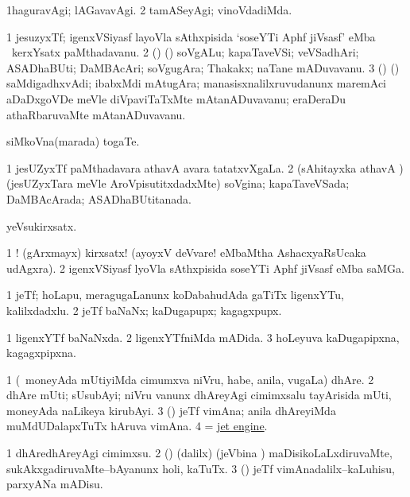 \bentry
{}
\gl{\kirxvi}
\bmng
\bnum
\num{1}haguravAgi; lAGavavAgi. 
\num{2} tamASeyAgi; vinoVdadiMda. 
\enum
\emng
\eentry

\bentry
{}
\gl{\nA}
\bmng
\bnum
\num{1} jesuzyxTf; igenxVSiyasf layoVla sAthxpisida `soseYTi Aphf jiVsasf' eMba \roVkAyx\ kerxYsatx paMthadavanu. 
\num{2} (\hiV) (\pArxparx) soVgALu; kapaTaveVSi; veVSadhAri; ASADhaBUti; DaMBAcAri; soVgugAra; Thakakx; naTane mADuvavanu. 
\num{3} (\ca) (\hiV) saMdigadhxvAdi; ibabxMdi mAtugAra; manasisxnalilxruvudanunx maremAci aDaDxgoVDe meVle diVpaviTaTxMte mAtanADuvavanu; eraDeraDu athaRbaruvaMte mAtanADuvavanu. 
\enum
\emng

\noindent
\gl{\pagu}
\bmng
{} siMkoVna(marada) togaTe. 
\emng
\eentry

\bentry
{}
\gl{\gu}
\bmng
\bnum
\num{1} jesUZyxTf paMthadavara athavA avara tatatxvXgaLa. 
\num{2} (sAhitayxka athavA \hiV) (jesUZyxTara meVle AroVpisutitxdadxMte) soVgina; kapaTaveVSada; DaMBAcArada; ASADhaBUtitanada. 
\enum
\emng
\eentry

\bentry
{}
\gl{\nA}
\bmng
yeVsukirxsatx. 
\emng

\noindent
\gl{\pagu}
\bmng
\bnum
\num{1} ! (gArxmayx) kirxsatx! (ayoyxV deVvare! eMbaMtha AshacxyaRsUcaka udAgxra). 
\num{2}  igenxVSiyasf lyoVla sAthxpisida soseYTi Aphf jiVsasf eMba saMGa. 
\enum
\emng
\eentry

\bentry
{}
\gl{\nA}
\bmng
\bnum
\num{1} jeTf; hoLapu, meragugaLanunx koDabahudAda gaTiTx ligenxYTu, kalilxdadxlu. 
\hypertarget{jet(1)2}{} 
\num{2} jeTf baNaNx; kaDugapupx; kagagxpupx. 
\enum
\emng
\eentry

\bentry
{}
\gl{\gu}
\bmng
\bnum
\num{1} ligenxYTf baNaNxda. 
\num{2} ligenxYTfniMda mADida. 
\hypertarget{jet(2)3}{} 
\num{3} hoLeyuva kaDugapipxna, kagagxpipxna. 
\enum
\emng
\eentry

\bentry
{}
\gl{\nA}
\bmng
\bnum
\num{1} (\kanmu\ moneyAda mUtiyiMda cimumxva niVru, habe, anila, \mo vugaLa) dhAre. 
\num{2} dhAre mUti; sUsubAyi; niVru \mo vanunx dhAreyAgi cimimxsalu tayArisida mUti, moneyAda naLikeya kirubAyi. 
\num{3} (\AmA) jeTf vimAna; anila dhAreyiMda muMdUDalapxTuTx hAruva vimAna. 
\num{4}  = \hyperlink{jet engine}{jet engine}. 
\enum
\emng
\eentry

\bentry
{}
\gl{\sakirx}
\bmng
\bnum
\num{1} dhAredhAreyAgi cimimxsu. 
\num{2} (\birx) (\BUkaq dalilx) (jeVbina \vi) maDisikoLaLxdiruvaMte, sukAkxgadiruvaMte--bAyanunx holi, kaTuTx. 
\num{3} (\AmA) jeTf vimAnadalilx--kaLuhisu, parxyANa mADisu. 
\enum
\emng


